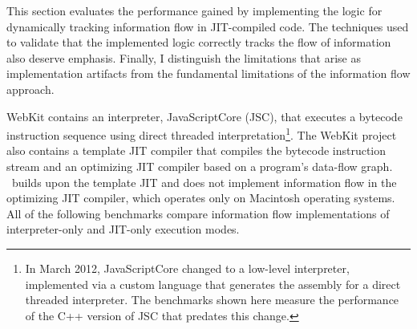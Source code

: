 This section evaluates the performance gained by implementing the logic for dynamically tracking information flow in JIT-compiled code.
The techniques used to validate that the implemented logic correctly tracks the flow of information also deserve emphasis.
Finally, I distinguish the limitations that arise as implementation artifacts from the fundamental limitations of the information flow approach.

WebKit contains an interpreter, JavaScriptCore (JSC), that executes a bytecode instruction sequence using direct threaded interpretation\footnote{
In March 2012, JavaScriptCore changed to a low-level interpreter, implemented via a custom language that generates the assembly for a direct threaded interpreter.
The benchmarks shown here measure the performance of the C++ version of JSC that predates this change.
}.
The WebKit project also contains a template JIT compiler that compiles the bytecode instruction stream and an optimizing JIT compiler based on a program's data-flow graph.
\JitFlow\ builds upon the template JIT and does not implement information flow in the optimizing JIT compiler, which operates only on Macintosh operating systems.
All of the following benchmarks compare information flow implementations of interpreter-only and JIT-only execution modes.

